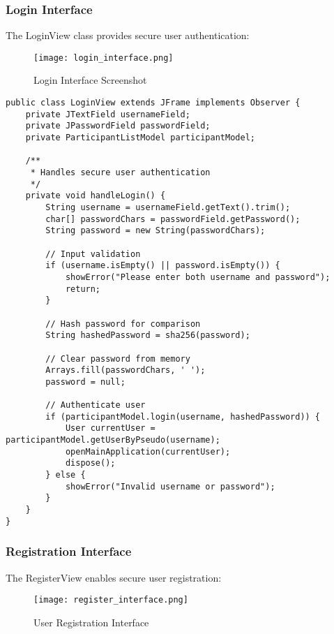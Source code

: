 \documentclass[12pt,a4paper]{article}
\begin{document}
\subsubsection{Login Interface}

The LoginView class provides secure user authentication:

\begin{figure}[H]
    \centering
    \texttt{[image: login\_interface.png]}
    \caption{Login Interface Screenshot}
    \label{fig:login}
\end{figure}

\begin{lstlisting}[caption=Login Interface Security Implementation]
public class LoginView extends JFrame implements Observer {
    private JTextField usernameField;
    private JPasswordField passwordField;
    private ParticipantListModel participantModel;

    /**
     * Handles secure user authentication
     */
    private void handleLogin() {
        String username = usernameField.getText().trim();
        char[] passwordChars = passwordField.getPassword();
        String password = new String(passwordChars);

        // Input validation
        if (username.isEmpty() || password.isEmpty()) {
            showError("Please enter both username and password");
            return;
        }

        // Hash password for comparison
        String hashedPassword = sha256(password);

        // Clear password from memory
        Arrays.fill(passwordChars, ' ');
        password = null;

        // Authenticate user
        if (participantModel.login(username, hashedPassword)) {
            User currentUser = participantModel.getUserByPseudo(username);
            openMainApplication(currentUser);
            dispose();
        } else {
            showError("Invalid username or password");
        }
    }
}
\end{lstlisting}

\subsubsection{Registration Interface}

The RegisterView enables secure user registration:

\begin{figure}[H]
    \centering
    \texttt{[image: register\_interface.png]}
    \caption{User Registration Interface}
    \label{fig:register}
\end{figure}
\end{document}
